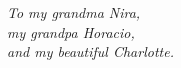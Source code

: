 %
\begin{frontmatter}

%
%
\makefrontmatter 

%
%   
%
%
%


\begin{mydedication} %
  \vfil
  \centering
  \emph{
    To my grandma Nira,\\
    my grandpa Horacio,\\
    and my beautiful Charlotte.
  }
  \vfil
\end{mydedication}
\clearpage


%
%


\end{frontmatter}
